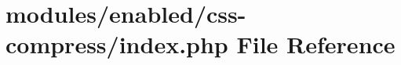 \hypertarget{enabled_2css-compress_2index_8php}{\section{modules/enabled/css-\/compress/index.php File Reference}
\label{enabled_2css-compress_2index_8php}
}
